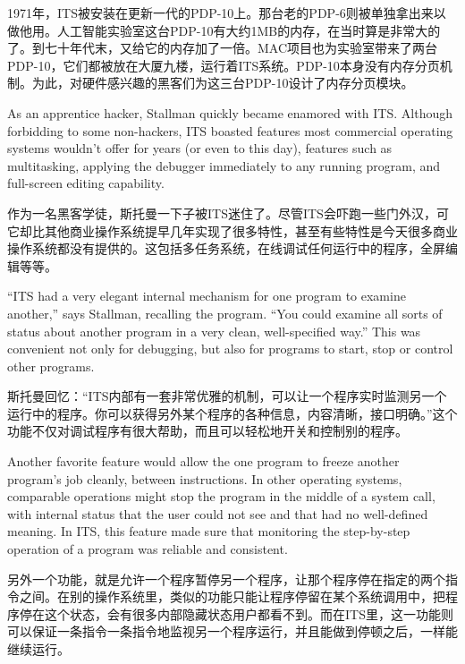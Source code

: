 \ifdefined\chs
1971年，ITS被安装在更新一代的PDP-10上。那台老的PDP-6则被单独拿出来以做他用。人工智能实验室这台PDP-10有大约1MB的内存，在当时算是非常大的了。到七十年代末，又给它的内存加了一倍。MAC项目也为实验室带来了两台PDP-10，它们都被放在大厦九楼，运行着ITS系统。PDP-10本身没有内存分页机制。为此，对硬件感兴趣的黑客们为这三台PDP-10设计了内存分页模块。
\fi

\ifdefined\eng
As an apprentice hacker, Stallman quickly became enamored with ITS. Although forbidding to some non-hackers, ITS boasted features most commercial operating systems wouldn't offer for years (or even to this day), features such as multitasking, applying the debugger immediately to any running program, and full-screen editing capability. 
\fi

\ifdefined\chs
作为一名黑客学徒，斯托曼一下子被ITS迷住了。尽管ITS会吓跑一些门外汉，可它却比其他商业操作系统提早几年实现了很多特性，甚至有些特性是今天很多商业操作系统都没有提供的。这包括多任务系统，在线调试任何运行中的程序，全屏编辑等等。
\fi

\ifdefined\eng
``ITS had a very elegant internal mechanism for one program to examine another,'' says Stallman, recalling the program. ``You could examine all sorts of status about another program in a very clean, well-specified way.''  This was convenient
not only for debugging, but also for programs to start, stop or control other programs.
\fi

\ifdefined\chs
斯托曼回忆：``ITS内部有一套非常优雅的机制，可以让一个程序实时监测另一个运行中的程序。你可以获得另外某个程序的各种信息，内容清晰，接口明确。''这个功能不仅对调试程序有很大帮助，而且可以轻松地开关和控制别的程序。
\fi

\ifdefined\eng
Another favorite feature would allow the one program to freeze another program's job cleanly, between instructions. In other operating systems, comparable operations might stop the program in the middle of a system call, with internal status that the user could not see and that had no well-defined meaning. In ITS, this feature made sure that monitoring the step-by-step operation of a program was reliable and consistent.
\fi

\ifdefined\chs
另外一个功能，就是允许一个程序暂停另一个程序，让那个程序停在指定的两个指令之间。在别的操作系统里，类似的功能只能让程序停留在某个系统调用中，把程序停在这个状态，会有很多内部隐藏状态用户都看不到。而在ITS里，这一功能则可以保证一条指令一条指令地监视另一个程序运行，并且能做到停顿之后，一样能继续运行。
\fi

